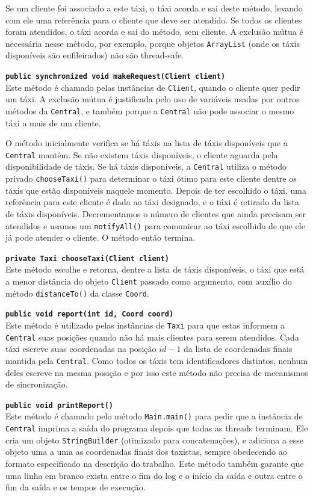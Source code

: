 \documentclass[a4paper,landscape,12pt]{article}
\begin{document}
Se um cliente foi associado a este táxi, o táxi acorda e sai deste método, levando com ele uma referência para o cliente que deve ser atendido.
Se todos os clientes foram atendidos, o táxi acorda e sai do método, sem cliente.
A exclusão mútua é necessária nesse método, por exemplo, porque objetos \texttt{ArrayList} (onde os táxis disponíveis são enfileirados) não são thread-safe.

\textbf{\texttt{public synchronized void makeRequest(Client client)}} \\
Este método é chamado pelas instâncias de \texttt{Client}, quando o cliente quer pedir um táxi. A exclusão mútua é justificada pelo uso de variáveis usadas por outros métodos da \texttt{Central}, e também porque a \texttt{Central} não pode associar o mesmo táxi a mais de um cliente.

O método inicialmente verifica se há táxis na lista de táxis disponíveis que a \texttt{Central} mantém. Se não existem táxis disponíveis, o cliente aguarda pela disponibilidade de táxis. Se há táxis disponíveis, a \texttt{Central} utiliza o método privado \texttt{chooseTaxi()} para determinar o táxi ótimo para este cliente dentre os táxis que estão disponíveis naquele momento. Depois de ter escolhido o táxi, uma referência para este cliente é dada ao táxi designado, e o táxi é retirado da lista de táxis disponíveis.
Decrementamos o número de clientes que ainda precisam ser atendidos e usamos um \texttt{notifyAll()} para comunicar ao táxi escolhido de que ele já pode atender o cliente. O método então termina.

\textbf{\texttt{private Taxi chooseTaxi(Client client)}} \\
Este método escolhe e retorna, dentre a lista de táxis disponíveis, o táxi que está a menor distância do objeto \texttt{Client} passado como argumento, com auxílio do método \texttt{distanceTo()} da classe \texttt{Coord}.

\textbf{\texttt{public void report(int id, Coord coord)}} \\
Este método é utilizado pelas instâncias de \texttt{Taxi} para que estas informem a \texttt{Cen\-tral} suas posições quando não há mais clientes para serem atendidos. Cada táxi escreve suas coordenadas na posição $id-1$ da lista de coordenadas finais mantida pela \texttt{Central}. Como todos os táxis tem identificadores distintos, nenhum deles escreve na mesma posição e por isso este método não precisa de mecanismos de sincronização.

\textbf{\texttt{public void printReport()}} \\
Este método é chamado pelo método \texttt{Main.main()} para pedir que a instância de \texttt{Central} imprima a saída do programa depois que todas as threads terminam. Ele cria um objeto \texttt{StringBuilder} (otimizado para concatenações), e adiciona a esse objeto uma a uma as coordenadas finais dos taxistas, sempre obedecendo ao formato especificado na descrição do trabalho. Este método também garante que uma linha em branco exista entre o fim do log e o início da saída e outra entre o fim da saída e os tempos de execução.
\end{document}

